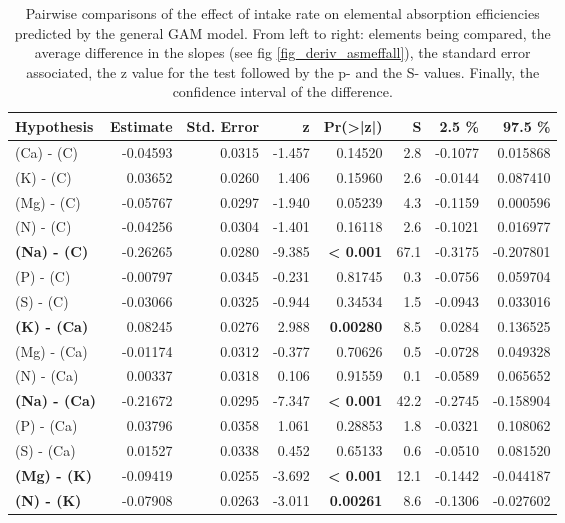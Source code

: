 \begin{table}[H]
\centering
\caption{\label{tab:table_pairs_d_ae}Pairwise comparisons of the effect of intake rate on elemental absorption efficiencies predicted by the general GAM model. From left to right: elements being compared, the average difference in the slopes (see fig \ref{fig_deriv_asmeffall}), the standard error associated, the z value for the test followed by the p- and the S- values. Finally, the confidence interval of the difference.}
\centering
\begin{tabular}[t]{>{}lrrr>{}rrrr}
\toprule
\textbf{Hypothesis} & \textbf{Estimate} & \textbf{Std. Error} & \textbf{z} & \textbf{Pr(>|z|)} & \textbf{S} & \textbf{2.5 \%} & \textbf{97.5 \%}\\
\midrule
(Ca) - (C) & -0.04593 & 0.0315 & -1.457 & 0.14520 & 2.8 & -0.1077 & 0.015868\\
(K) - (C) & 0.03652 & 0.0260 & 1.406 & 0.15960 & 2.6 & -0.0144 & 0.087410\\
(Mg) - (C) & -0.05767 & 0.0297 & -1.940 & 0.05239 & 4.3 & -0.1159 & 0.000596\\
(N) - (C) & -0.04256 & 0.0304 & -1.401 & 0.16118 & 2.6 & -0.1021 & 0.016977\\
\textbf{(Na) - (C)} & -0.26265 & 0.0280 & -9.385 & \textbf{< 0.001} & 67.1 & -0.3175 & -0.207801\\
(P) - (C) & -0.00797 & 0.0345 & -0.231 & 0.81745 & 0.3 & -0.0756 & 0.059704\\
(S) - (C) & -0.03066 & 0.0325 & -0.944 & 0.34534 & 1.5 & -0.0943 & 0.033016\\
\textbf{(K) - (Ca)} & 0.08245 & 0.0276 & 2.988 & \textbf{0.00280} & 8.5 & 0.0284 & 0.136525\\
(Mg) - (Ca) & -0.01174 & 0.0312 & -0.377 & 0.70626 & 0.5 & -0.0728 & 0.049328\\
(N) - (Ca) & 0.00337 & 0.0318 & 0.106 & 0.91559 & 0.1 & -0.0589 & 0.065652\\
\textbf{(Na) - (Ca)} & -0.21672 & 0.0295 & -7.347 & \textbf{< 0.001} & 42.2 & -0.2745 & -0.158904\\
(P) - (Ca) & 0.03796 & 0.0358 & 1.061 & 0.28853 & 1.8 & -0.0321 & 0.108062\\
(S) - (Ca) & 0.01527 & 0.0338 & 0.452 & 0.65133 & 0.6 & -0.0510 & 0.081520\\
\textbf{(Mg) - (K)} & -0.09419 & 0.0255 & -3.692 & \textbf{< 0.001} & 12.1 & -0.1442 & -0.044187\\
\textbf{(N) - (K)} & -0.07908 & 0.0263 & -3.011 & \textbf{0.00261} & 8.6 & -0.1306 & -0.027602\\

\end{tabular}
\end{table}
